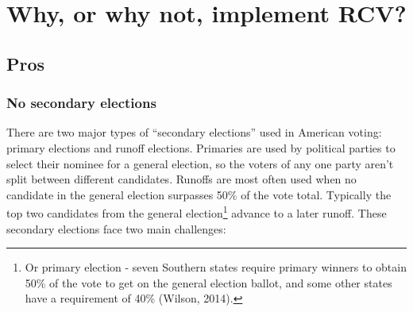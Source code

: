 \documentclass[12pt,twoside]{reedthesis}
\begin{document}
\hypertarget{rcv-args}{%
\section{Why, or why not, implement RCV?}\label{rcv-args}}

\hypertarget{pros}{%
\subsection{Pros}\label{pros}}

\hypertarget{no-secondary-elections}{%
\subsubsection{No secondary elections}\label{no-secondary-elections}}

There are two major types of ``secondary elections'' used in American voting: primary elections and runoff elections. Primaries are used by political parties to select their nominee for a general election, so the voters of any one party aren't split between different candidates. Runoffs are most often used when no candidate in the general election surpasses 50\% of the vote total. Typically the top two candidates from the general election\footnote{Or primary election - seven Southern states require primary winners to obtain 50\% of the vote to get on the general election ballot, and some other states have a requirement of 40\% (Wilson, 2014).} advance to a later runoff. These secondary elections face two main challenges:
\end{document}
